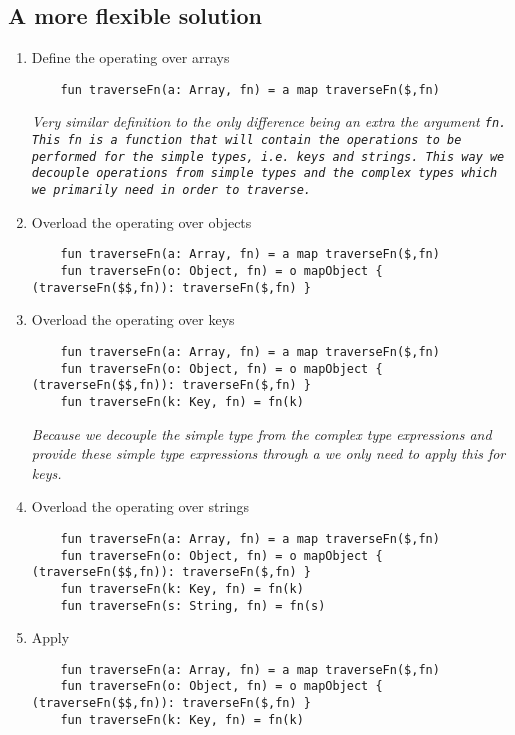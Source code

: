 \subsection{A more flexible solution}
\begin{enumerate}[resume*]
\item Define the  operating over arrays
  \begin{verbatim}
    fun traverseFn(a: Array, fn) = a map traverseFn($,fn)
  \end{verbatim}
  \emph{
    Very similar definition to  the only difference being an extra the argument \tt{fn}.  This \tt{fn} is a function that will contain the operations to be performed for the simple types, i.e. keys and strings.  This way we decouple operations from simple types and the complex types which we primarily need in order to traverse. 
  }
\item Overload the  operating over objects
  \begin{verbatim}
    fun traverseFn(a: Array, fn) = a map traverseFn($,fn)
    fun traverseFn(o: Object, fn) = o mapObject { (traverseFn($$,fn)): traverseFn($,fn) }
  \end{verbatim}
\item Overload the  operating over keys
  \begin{verbatim}
    fun traverseFn(a: Array, fn) = a map traverseFn($,fn)
    fun traverseFn(o: Object, fn) = o mapObject { (traverseFn($$,fn)): traverseFn($,fn) }
    fun traverseFn(k: Key, fn) = fn(k)
  \end{verbatim}
  \emph{
    Because we decouple the simple type from the complex type expressions and provide these simple type expressions through a \les{} we only need to apply this \les{} for keys. 
  }
\item Overload the  operating over strings
  \begin{verbatim}
    fun traverseFn(a: Array, fn) = a map traverseFn($,fn)
    fun traverseFn(o: Object, fn) = o mapObject { (traverseFn($$,fn)): traverseFn($,fn) }
    fun traverseFn(k: Key, fn) = fn(k)
    fun traverseFn(s: String, fn) = fn(s)
  \end{verbatim}
\item Apply 
  \begin{verbatim}
    fun traverseFn(a: Array, fn) = a map traverseFn($,fn)
    fun traverseFn(o: Object, fn) = o mapObject { (traverseFn($$,fn)): traverseFn($,fn) }
    fun traverseFn(k: Key, fn) = fn(k)

\end{verbatim}
\end{enumerate}
